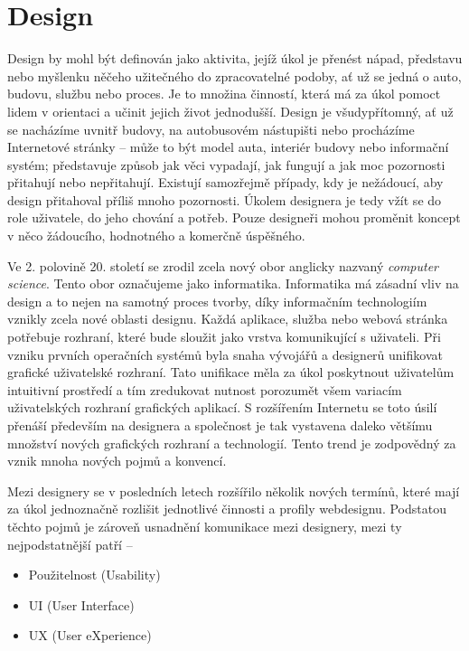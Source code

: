 \chapter{Design}
\label{chap:design}

Design by mohl být definován jako aktivita, jejíž úkol je přenést nápad, představu nebo myšlenku něčeho užitečného do zpracovatelné podoby, ať už se jedná o auto, budovu, službu nebo proces. Je to množina činností, která má za úkol pomoct lidem v orientaci a učinit jejich život jednodušší. Design je všudypřítomný, ať už se nacházíme uvnitř budovy, na autobusovém nástupišti nebo procházíme Internetové stránky -- může to být model auta, interiér budovy nebo informační systém; představuje způsob jak věci vypadají, jak fungují a jak moc pozornosti přitahují nebo nepřitahují. Existují samozřejmě případy, kdy je nežádoucí, aby design přitahoval příliš mnoho pozornosti. Úkolem designera je tedy vžít se do role uživatele, do jeho chování a potřeb. Pouze designeři mohou proměnit koncept v něco žádoucího, hodnotného a komerčně úspěšného.

Ve 2. polovině 20. století se zrodil zcela nový obor anglicky nazvaný \textit{computer science}. Tento obor označujeme jako informatika. Informatika má zásadní vliv na design a to nejen na samotný proces tvorby, díky informačním technologiím vznikly zcela nové oblasti designu. Každá aplikace, služba nebo webová stránka potřebuje rozhraní, které bude sloužit jako vrstva komunikující s uživateli. Při vzniku prvních operačních systémů byla snaha vývojářů a designerů unifikovat grafické uživatelské rozhraní. Tato unifikace měla za úkol poskytnout uživatelům intuitivní prostředí a tím zredukovat nutnost porozumět všem variacím uživatelských rozhraní grafických aplikací. S rozšířením Internetu se toto úsilí přenáší především na designera a společnost je tak vystavena daleko většímu množství nových grafických rozhraní a technologií. Tento trend je zodpovědný za vznik mnoha nových pojmů a konvencí.

Mezi designery se v posledních letech rozšířilo několik nových termínů, které mají za úkol jednoznačně rozlišit jednotlivé činnosti a profily webdesignu. Podstatou těchto pojmů je zároveň usnadnění komunikace mezi designery, mezi ty nejpodstatnější patří --

\begin{itemize}
    \item Použitelnost (Usability)
    \item UI (User Interface)
    \item UX (User eXperience)
\end{itemize}

